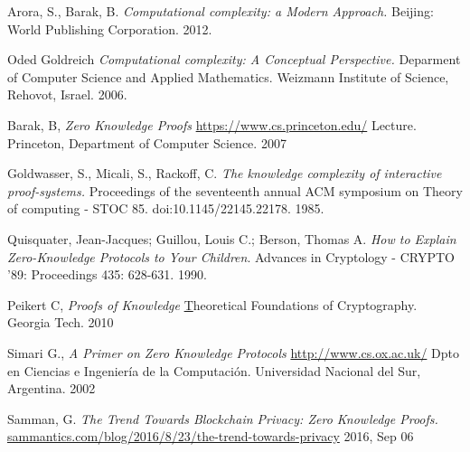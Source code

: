 \documentclass[oneside,10pt]{article}
\begin{document}
\begin{thebibliography}{99}

  Arora, S.,  Barak, B. 
  \emph{Computational complexity: a Modern Approach.}
  Beijing: World Publishing Corporation.
  2012.

  Oded Goldreich
  \emph{Computational complexity: A Conceptual Perspective.}
  Deparment of Computer Science and Applied Mathematics.
  Weizmann Institute of Science, Rehovot, Israel.
  2006.
  
  Barak, B,
  \emph{Zero Knowledge Proofs}
  \href{https://www.cs.princeton.edu/courses/archive/fall07/cos433/lec15.pdf}
       {https://www.cs.princeton.edu/}
       Lecture.
       Princeton, Department of Computer Science.
       2007

  Goldwasser, S., Micali, S.,  Rackoff, C.
  \emph{The knowledge complexity of interactive proof-systems.}
  Proceedings of the seventeenth annual ACM symposium on Theory of computing - STOC 85.
  doi:10.1145/22145.22178.
  1985.

  Quisquater, Jean-Jacques; Guillou, Louis C.; Berson, Thomas A.
  \emph{How to Explain Zero-Knowledge Protocols to Your Children}.
  Advances in Cryptology - CRYPTO '89:
  Proceedings 435: 628-631.
  1990.

  Peikert C,
  \emph{Proofs of Knowledge}
  \href{https://wiki.cc.gatech.edu/theory/images/5/54/Lec18.pdf}
  Theoretical Foundations of Cryptography.
  Georgia Tech.
  2010

  Simari G.,
  \emph{A Primer on Zero Knowledge Protocols}
  \href{http://www.cs.ox.ac.uk/people/gerardo.simari/personal/publications/zkp-simari2002.pdf}
  {http://www.cs.ox.ac.uk/}
  Dpto en Ciencias e Ingeniería de la Computación.
  Universidad Nacional del Sur, Argentina.
  2002
  
  Samman, G.
  \emph{The Trend Towards Blockchain Privacy: Zero Knowledge Proofs.}
  \href{http://sammantics.com/blog/2016/8/23/the-trend-towards-privacy-how-blockchains-plan-to-accomplish-this}
  {sammantics.com/blog/2016/8/23/the-trend-towards-privacy}
  2016, Sep 06

\end{thebibliography}
\end{document}
